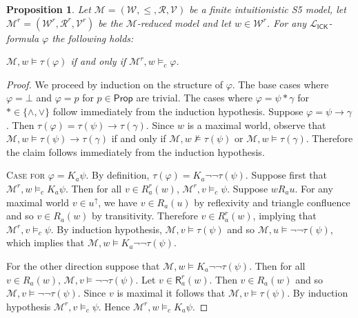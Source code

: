 \documentclass{myifcolog}
\newcommand{\K}{K}
\newcommand\Prop {\mathsf{Prop}}
\newcommand\R{\mathsf{R}}
\newcommand{\agi}{a}
\newcommand{\ICK}{\mathsf{ICK}}
\newcommand{\fw}{\mathcal{M}}
\newcommand{\W}{\mathcal{W}}
\newcommand{\rel}{\mathcal{R}}
\newcommand{\V}{\mathcal{V}}
\newtheorem{proposition}[theorem]{Proposition}
\numberwithin{theorem}{section}
\begin{document}
\begin{proposition}\label{l: tau_0 preserves truth}
     Let $\fw=(\W, \leq, \rel, \V)$ be a finite intuitionistic S5 model, let $\fw^r =(\W^r, \rel^r, \V^r)$ be the $\fw$-reduced model and let $w \in  \W^r$. For any $\mathcal{L}_\ICK$-formula $\varphi$ the following holds:
     \begin{center}
         $\fw,w \models \tau(\varphi)$ if and only if $\fw^r, w \models_c \varphi$. 
     \end{center} 
\end{proposition}
\begin{proof}
    We proceed by induction on the structure of $\varphi$. The base cases where $\varphi = \bot$ and $\varphi = p$ for $p \in \Prop$ are trivial. The cases where $\varphi = \psi \ast \gamma$ for $\ast \in \{\wedge, \vee\}$ follow immediately from the induction hypothesis. Suppose $\varphi = \psi \rightarrow \gamma$. Then $\tau(\varphi) = \tau(\psi) \rightarrow \tau(\gamma)$. Since $w$ is a maximal world, observe that $\fw,w \models \tau(\psi) \rightarrow \tau(\gamma)$ if and only if $\fw,w \not \models \tau(\psi)$ or $\fw,w \models \tau(\gamma)$. Therefore the claim follows immediately from the induction hypothesis.\smallskip 
    
    \noindent \textsc{Case for $\varphi = \K_\agi \psi$.} By definition, $\tau(\varphi) = \K_\agi \neg \neg \tau(\psi)$. Suppose first that $\fw^r, w \models_c \K_\agi \psi$. Then for all $v \in R_\agi^r(w)$, $\fw^r,v \models_c \psi$. Suppose $w \mathrel{R_\agi} u$. For any maximal world $v \in u^\uparrow$, we have $v \in R_\agi(u)$ by reflexivity and triangle confluence and so $v \in R_\agi(w)$ by transitivity. Therefore $v \in R_\agi^r(w)$, implying that $\fw^r, v \models_c \psi$. By induction hypothesis, $\fw,v \models \tau(\psi)$ and so $\fw,u \models \neg \neg \tau(\psi)$, which implies that $\fw,w \models \K_\agi \neg \neg \tau(\psi)$. 
    
    For the other direction suppose that $\fw, w \models \K_\agi \neg \neg \tau(\psi)$. Then for all $v \in R_\agi(w)$, $\fw,v \models \neg \neg \tau(\psi)$. Let $v \in \R_\agi^r(w)$. Then $v \in R_\agi(w)$ and so ${\fw, v \models \neg \neg \tau(\psi)}$. Since $v$ is maximal it follows that $\fw,v \models \tau(\psi)$. By induction hypothesis $\fw^r, v \models_c \psi$. Hence $\fw^r, w \models_c \K_\agi \psi$.\smallskip


\end{proof}
\end{document}

